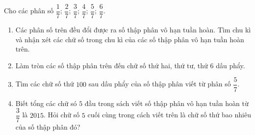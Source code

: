 \begin{vd}%
	Cho các phân số $\dfrac{1}{7}$; $\dfrac{2}{7}$; $\dfrac{3}{7}$; $\dfrac{4}{7}$; $\dfrac{5}{7}$; $\dfrac{6}{7}$.
	\begin{enumerate}
		\item Các phân số trên đều đổi được ra số thập phân vô hạn tuần hoàn. Tìm chu kì và nhận xét các chữ số trong chu kì của các số thập phân vô hạn tuần hoàn trên.
		\item Làm tròn các số thập phân trên đến chữ số thứ hai, thứ tư, thứ $6$ dấu phẩy.
		\item Tìm các chữ số thứ $100$ sau dấu phẩy của số thập phân viết từ phân số $\dfrac{5}{7}$.
		\item Biết tổng các chữ só $5$ đầu trong sách viết số thập phân vô hạn tuần hoàn từ $\dfrac{3}{7}$ là $2015$. Hỏi chữ số $5$ cuối cùng trong cách viết trên là chữ số thứ bao nhiêu của số thập phân đó?
	\end{enumerate}
\end{vd}
